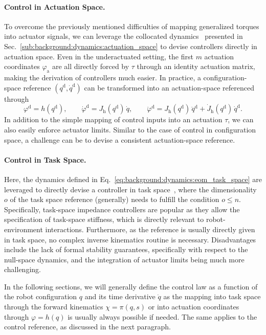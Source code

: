 \paragraph{Control in Actuation Space.}
To overcome the previously mentioned difficulties of mapping generalized torques into actuator signals, we can leverage the collocated dynamics~\citep{pustina2024input} presented in Sec.~\ref{sub:background:dynamics:actuation_space} to devise controllers directly in actuation space. Even in the underactuated setting, the first $m$ actuation coordinates $\varphi_\mathrm{a}$ are all directly forced by $\tau$ through an identity actuation matrix, making the derivation of controllers much easier.
In practice, a configuration-space reference $(q^\mathrm{d},\dot{q}^\mathrm{d})$ can be transformed into an actuation-space referenced through 
\begin{equation}
    \varphi^\mathrm{d} = h(q^\mathrm{d}),
    \qquad
    \dot{\varphi}^\mathrm{d} = J_\mathrm{h}(q^\mathrm{d}) \, \dot{q},
    \qquad
    \ddot{\varphi}^\mathrm{d} = J_\mathrm{h}(q^\mathrm{d}) \, \ddot{q}^\mathrm{d} + \dot{J}_\mathrm{h}(q^\mathrm{d}) \, \dot{q}^\mathrm{d}.
\end{equation}
In addition to the simple mapping of control inputs into an actuation $\tau$, we can also easily enforce actuator limits.
Similar to the case of control in configuration space, a challenge can be to devise a consistent actuation-space reference.

\paragraph{Control in Task Space.}
Here, the dynamics defined in Eq.~\ref{eq:background:dynamics:eom_task_space} are leveraged to directly devise a controller in task space~\citep{khatib1987unified}, where the dimensionality $o$ of the task space reference (generally) needs to fulfill the condition $o \leq n$.
Specifically, task-space impedance controllers are popular as they allow the specification of task-space stiffness, which is directly relevant to robot-environment interactions. Furthermore, as the reference is usually directly given in task space, no complex inverse kinematics routine is necessary.
Disadvantages include the lack of formal stability guarantees, specifically with respect to the null-space dynamics, and the integration of actuator limits being much more challenging.

In the following sections, we will generally define the control law as a function of the robot configuration $q$ and its time derivative $\dot{q}$ as the mapping into task space through the forward kinematics $\chi = \pi(q,s)$ or into actuation coordinates through $\varphi = h(q)$ is usually always possible if needed. The same applies to the control reference, as discussed in the next paragraph.

